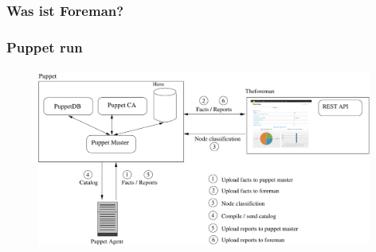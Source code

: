 \documentclass{beamer}
\begin{document}
\begin{frame}
  \frametitle{Was ist Foreman?}
  \begin{figure}[ht]
    \centering
    \label{fig:stack}
  \end{figure}
\end{frame}

\begin{frame}
  \frametitle{Puppet run}
  \begin{figure}[ht]
    \centering
      \includegraphics[height=6cm,width=11cm]{../pics/puppet_overview}
    \label{fig:stack}
  \end{figure}
\end{frame}

\begin{frame}
\end{frame}
\end{document}
